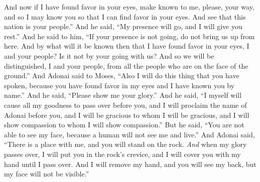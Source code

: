 \begin{biblechapter}
\verse And now if I have found favor in your eyes, make known to me, please, your way, and so I may know you so that I can find favor in your eyes. And see that this nation is your people.”
\verse And he said, “My presence will go, and I will give you rest.”
\verse And he said to him, “If your presence is not going, do not bring us up from here.
\verse And by what will it be known then that I have found favor in your eyes, I and your people? Is it not by your going with us? And so we will be distinguished, I and your people, from all the people who are on the face of the ground.”
\verse And Adonai said to Moses, “Also I will do this thing that you have spoken, because you have found favor in my eyes and I have known you by name.”
\verse And he said, “Please show me your glory.”
\verse And he said, “I myself will cause all my goodness to pass over before you, and I will proclaim the name of Adonai before you, and I will be gracious to whom I will be gracious, and I will show compassion to whom I will show compassion.”
\verse But he said, “You are not able to see my face, because a human will not see me and live.”
\verse And Adonai said, “There is a place with me, and you will stand on the rock.
\verse \textit{And} when my glory passes over, I will put you in the rock’s crevice, and I will cover you with my hand until I pass over.
\verse And I will remove my hand, and you will see my back, but my face will not be visible.”
\end{biblechapter}

